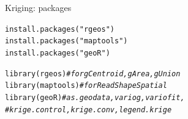 \documentclass[xcolor=table,       handout,    xcolor=dvipsnames]{beamer}\usepackage[]{graphicx}\usepackage[]{color}
\makeatletter
\newcommand{\hlstr}[1]{\textcolor[rgb]{0.545,0.137,0.137}{#1}}
\newcommand{\hlcom}[1]{\textcolor[rgb]{0,0.392,0}{\textit{#1}}}
\newcommand{\hlstd}[1]{\textcolor[rgb]{0,0,0}{#1}}
\newcommand{\hlkwd}[1]{\textcolor[rgb]{0,0,1}{#1}}
\newenvironment{kframe}{%
 \def\at@end@of@kframe{}%
 \ifinner\ifhmode%
  \def\at@end@of@kframe{\end{minipage}}%
  \begin{minipage}{\columnwidth}%
 \fi\fi%
 \def\FrameCommand##1{\hskip\@totalleftmargin \hskip-\fboxsep
 \colorbox{shadecolor}{##1}\hskip-\fboxsep
     \hskip-\linewidth \hskip-\@totalleftmargin \hskip\columnwidth}%
 \MakeFramed {\advance\hsize-\width
   \@totalleftmargin\z@ \linewidth\hsize
   \@setminipage}}%
 {\par\unskip\endMakeFramed%
 \at@end@of@kframe}
\newenvironment{knitrout}{}{} %
\makeatother
\begin{document}

\begin{frame}[fragile]{Kriging: packages}
\begin{knitrout}
\color{fgcolor}\begin{kframe}
\begin{alltt}
\hlkwd{install.packages}\hlstd{(}\hlstr{"rgeos"}\hlstd{)}
\hlkwd{install.packages}\hlstd{(}\hlstr{"maptools"}\hlstd{)}
\hlkwd{install.packages}\hlstd{(}\hlstr{"geoR"}\hlstd{)}
\end{alltt}
\end{kframe}
\end{knitrout}
\begin{knitrout}
\color{fgcolor}\begin{kframe}
\begin{alltt}
\hlkwd{library}\hlstd{(rgeos)}    \hlcom{# for gCentroid, gArea, gUnion}
\hlkwd{library}\hlstd{(maptools)} \hlcom{# for ReadShapeSpatial}
\hlkwd{library}\hlstd{(geoR)}     \hlcom{# as.geodata, variog, variofit,}
\hlcom{# krige.control, krige.conv, legend.krige}
\end{alltt}
\end{kframe}
\end{knitrout}

\end{frame}

\end{document}
